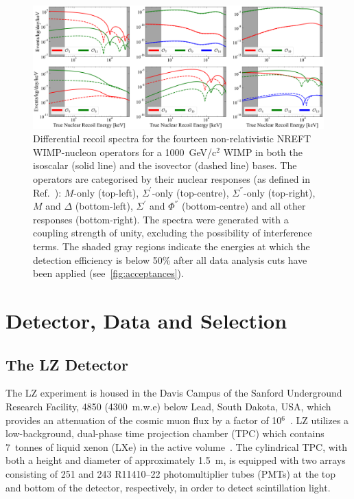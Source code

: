 \documentclass[reprint, showpacs,
preprintnumbers,
amsmath,amssymb,
aps, floatfix,
superscriptaddress,
prd, nofootinbib]{revtex4-1}
\begin{document}
\begin{figure}[hbt!]
    \centering
    \includegraphics[trim={8 5 5 5},clip, width=\textwidth]{logx_logy_m1000GeV_recoils-4}
    \caption{
    Differential recoil spectra for the fourteen non-relativistic NREFT WIMP-nucleon operators for a 1000~GeV/c$^2$ WIMP in both the isoscalar (solid line) and the isovector (dashed line) bases.
    The operators are categorised by their nuclear responses (as defined in Ref.~\cite{Anand:MathematicaEFT}): $M$-only (top-left), $\Sigma^{'}$-only (top-centre), $\Sigma^{''}$-only (top-right), $M$ and $\Delta$ (bottom-left), $\Sigma^{'}$ and $\Phi^{''}$ (bottom-centre) and all other responses (bottom-right).
    The spectra were generated with a coupling strength of unity, excluding the possibility of interference terms. 
    The shaded gray regions indicate the energies at which the detection efficiency is below 50\% after all data analysis cuts have been applied (see~\autoref{fig:acceptances}).}
    \label{fig:recoils}
\end{figure}

        

\section{\label{sec:lz_data_selection} Detector, Data and Selection}
\subsection{\label{subsec:selection}The LZ Detector} 
The LZ experiment is housed in the Davis Campus of the Sanford Underground Research Facility, 4850 (4300~m.w.e) below Lead, South Dakota, USA, which provides an attenuation of the cosmic muon flux by a factor of 10$^6$~\cite{LZ:Experiment_2020,LZ:TDR_2017}.
LZ utilizes a low-background, dual-phase time projection chamber (TPC) which contains 7~tonnes of liquid xenon (LXe) in the active volume~\cite{LZ:Experiment_2020,LZ:TDR_2017}. 
The cylindrical TPC, with both a height and diameter of approximately 1.5~m, is equipped with two arrays consisting of 251 and 243 R11410–22 photomultiplier tubes (PMTs) at the top and bottom of the detector, respectively, in order to detect scintillation light. 
\end{document}
